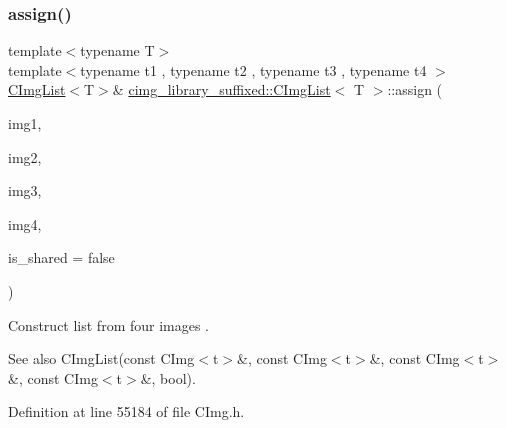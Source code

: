 \subsubsection{\texorpdfstring{assign()}{assign()}\hspace{0.1cm}{\footnotesize\ttfamily [11/18]}}
{\footnotesize\ttfamily template$<$typename T$>$ \\
template$<$typename t1 , typename t2 , typename t3 , typename t4 $>$ \\
\hyperlink{structcimg__library__suffixed_1_1CImgList}{C\+Img\+List}$<$T$>$\& \hyperlink{structcimg__library__suffixed_1_1CImgList}{cimg\+\_\+library\+\_\+suffixed\+::\+C\+Img\+List}$<$ T $>$\+::assign (\begin{DoxyParamCaption}\item[{const \hyperlink{structcimg__library__suffixed_1_1CImg}{C\+Img}$<$ t1 $>$ \&}]{img1,  }\item[{const \hyperlink{structcimg__library__suffixed_1_1CImg}{C\+Img}$<$ t2 $>$ \&}]{img2,  }\item[{const \hyperlink{structcimg__library__suffixed_1_1CImg}{C\+Img}$<$ t3 $>$ \&}]{img3,  }\item[{const \hyperlink{structcimg__library__suffixed_1_1CImg}{C\+Img}$<$ t4 $>$ \&}]{img4,  }\item[{const bool}]{is\+\_\+shared = {\ttfamily false} }\end{DoxyParamCaption})\hspace{0.3cm}{\ttfamily [inline]}}



Construct list from four images . 

\begin{DoxySeeAlso}{See also}
C\+Img\+List(const C\+Img$<$t$>$\&, const C\+Img$<$t$>$\&, const C\+Img$<$t$>$\&, const C\+Img$<$t$>$\&, bool). 
\end{DoxySeeAlso}


Definition at line 55184 of file C\+Img.\+h.

\mbox{\label{structcimg__library__suffixed_1_1CImgList_a528f9e8ca3f6c499f378a911da424933}} 

